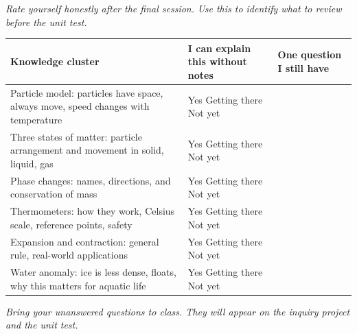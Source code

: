 \documentclass[11pt, a4paper]{article}
\begin{document}
\textit{Rate yourself honestly after the final session. Use this to identify what to review before the unit test.}

\begin{tabularx}{\linewidth}{|X|p{4.5cm}|X|}
\hline
\rowcolor{accentlight}
\textbf{Knowledge cluster} & \textbf{I can explain this without notes} & \textbf{One question I still have} \\
\hline
Particle model: particles have space, always move, speed changes with temperature &
Yes \quad Getting there \quad Not yet & \\[20pt]
\hline
Three states of matter: particle arrangement and movement in solid, liquid, gas &
Yes \quad Getting there \quad Not yet & \\[20pt]
\hline
Phase changes: names, directions, and conservation of mass &
Yes \quad Getting there \quad Not yet & \\[20pt]
\hline
Thermometers: how they work, Celsius scale, reference points, safety &
Yes \quad Getting there \quad Not yet & \\[20pt]
\hline
Expansion and contraction: general rule, real-world applications &
Yes \quad Getting there \quad Not yet & \\[20pt]
\hline
Water anomaly: ice is less dense, floats, why this matters for aquatic life &
Yes \quad Getting there \quad Not yet & \\[20pt]
\hline
\end{tabularx}

\smallskip
\textit{Bring your unanswered questions to class. They will appear on the inquiry project and the unit test.}
\end{document}
